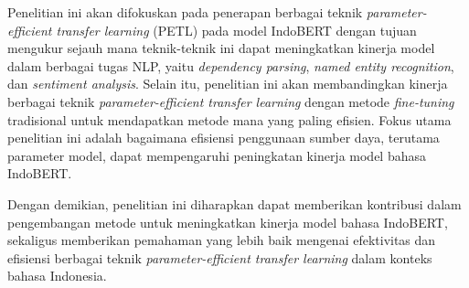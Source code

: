 Penelitian ini akan difokuskan pada penerapan berbagai teknik \textit{parameter-efficient transfer learning} (PETL) pada model IndoBERT dengan tujuan mengukur sejauh mana teknik-teknik ini dapat meningkatkan kinerja model dalam berbagai tugas NLP, yaitu \textit{dependency parsing}, \textit{named entity recognition}, dan \textit{sentiment analysis}. Selain itu, penelitian ini akan membandingkan kinerja berbagai teknik \textit{parameter-efficient transfer learning} dengan metode \textit{fine-tuning} tradisional untuk mendapatkan metode mana yang paling efisien. Fokus utama penelitian ini adalah bagaimana efisiensi penggunaan sumber daya, terutama parameter model, dapat mempengaruhi peningkatan kinerja model bahasa IndoBERT.

Dengan demikian, penelitian ini diharapkan dapat memberikan kontribusi dalam pengembangan metode untuk meningkatkan kinerja model bahasa IndoBERT, sekaligus memberikan pemahaman yang lebih baik mengenai efektivitas dan efisiensi berbagai teknik \textit{parameter-efficient transfer learning} dalam konteks bahasa Indonesia.